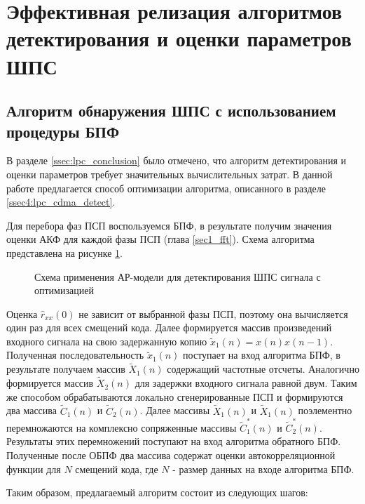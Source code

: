 \section{Эффективная релизация алгоритмов детектирования и оценки параметров ШПС}

\subsection{Алгоритм обнаружения ШПС с использованием процедуры БПФ}

В разделе \ref{ssec:lpc_conclusion} было отмечено, что алгоритм детектирования и оценки параметров
требует значительных вычислительных затрат. В данной работе предлагается способ оптимизации алгоритма,
описанного в разделе \ref{ssec4:lpc_cdma_detect}.

Для перебора фаз ПСП воспользуемся БПФ, в результате получим значения оценки АКФ для каждой фазы ПСП (глава \ref{sec1_fft}).
Схема алгоритма представлена на рисунке \ref{pic:lpc_basic2}. 

\begin{figure}[H]
	\center{}
	\caption{Схема применения АР-модели для детектирования ШПС сигнала с оптимизацией}
	\label{pic:lpc_basic2}
\end{figure}

Оценка ${\hat{r}_{xx}(0)}$ не зависит от выбранной фазы ПСП, поэтому она вычисляется один
раз для всех смещений кода. Далее формируется массив произведений входного сигнала на
свою задержанную копию ${\tilde{x}_1(n)=x(n)x(n-1)}$. Полученная последовательность  
${\tilde{x}_1(n)}$ поступает на вход алгоритма БПФ, в результате получаем массив ${\tilde{X}_1(n)}$
содержащий частотные отсчеты. Аналогично формируется массив  ${\tilde{X}_2(n)}$ для
задержки входного сигнала равной двум. Таким же способом обрабатываются локально
сгенерированные ПСП и формируются два массива ${\tilde{C}_1(n)}$ и ${\tilde{C}_2(n)}$.
Далее массивы ${\tilde{X}_1(n)}$ и ${\tilde{X}_1(n)}$ поэлементно перемножаются
на комплексно сопряженные массивы ${\tilde{C}_1^*(n)}$ и ${\tilde{C}_2^*(n)}$.
Результаты этих перемножений поступают на вход алгоритма обратного
БПФ. Полученные после ОБПФ два массива содержат оценки автокорреляционной функции для ${N}$ 
смещений кода, где  ${N}$ - размер данных на входе алгоритма БПФ.

Таким образом, предлагаемый алгоритм состоит из следующих шагов:

